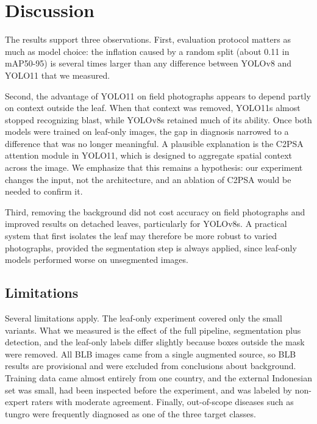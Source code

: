 \documentclass[conference]{IEEEtran}
\begin{document}
\section{Discussion}

The results support three observations. First, evaluation protocol matters as much as model choice: the inflation caused by a random split (about 0.11 in mAP50-95) is several times larger than any difference between YOLOv8 and YOLO11 that we measured.

Second, the advantage of YOLO11 on field photographs appears to depend partly on context outside the leaf. When that context was removed, YOLO11s almost stopped recognizing blast, while YOLOv8s retained much of its ability. Once both models were trained on leaf-only images, the gap in diagnosis narrowed to a difference that was no longer meaningful. A plausible explanation is the C2PSA attention module in YOLO11, which is designed to aggregate spatial context across the image. We emphasize that this remains a hypothesis: our experiment changes the input, not the architecture, and an ablation of C2PSA would be needed to confirm it.

Third, removing the background did not cost accuracy on field photographs and improved results on detached leaves, particularly for YOLOv8s. A practical system that first isolates the leaf may therefore be more robust to varied photographs, provided the segmentation step is always applied, since leaf-only models performed worse on unsegmented images.

\subsection{Limitations}
Several limitations apply. The leaf-only experiment covered only the small variants. What we measured is the effect of the full pipeline, segmentation plus detection, and the leaf-only labels differ slightly because boxes outside the mask were removed. All BLB images came from a single augmented source, so BLB results are provisional and were excluded from conclusions about background. Training data came almost entirely from one country, and the external Indonesian set was small, had been inspected before the experiment, and was labeled by non-expert raters with moderate agreement. Finally, out-of-scope diseases such as tungro were frequently diagnosed as one of the three target classes.
\end{document}
